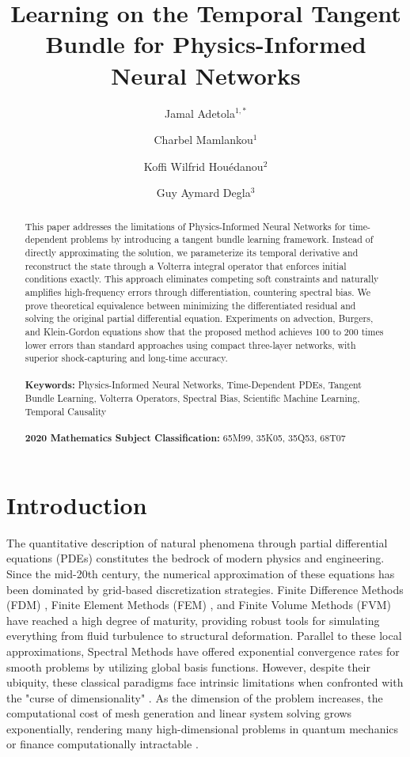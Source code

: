 \documentclass[11pt,reqno]{amsart}
\title[Learning on the Temporal Tangent Bundle]{Learning on the Temporal Tangent Bundle for Physics-Informed Neural Networks}
\author[J.A.]{Jamal Adetola$^{1,*}$}
\author[C.M.]{Charbel Mamlankou$^{1}$}
\author[K.W.H.]{Koffi Wilfrid Hou\'edanou$^2$}
\author[S.A.A.]{Guy Aymard Degla$^3$}
\theoremstyle{plain}
\theoremstyle{definition}
\theoremstyle{remark}
\begin{document}
\begin{abstract}
This paper addresses the limitations of Physics-Informed Neural Networks for time-dependent problems by introducing a tangent bundle learning framework. Instead of directly approximating the solution, we parameterize its temporal derivative and reconstruct the state through a Volterra integral operator that enforces initial conditions exactly. This approach eliminates competing soft constraints and naturally amplifies high-frequency errors through differentiation, countering spectral bias. We prove theoretical equivalence between minimizing the differentiated residual and solving the original partial differential equation. Experiments on advection, Burgers, and Klein-Gordon equations show that the proposed method achieves 100 to 200 times lower errors than standard approaches using compact three-layer networks, with superior shock-capturing and long-time accuracy.\\ \\
\textbf{Keywords:} Physics-Informed Neural Networks, Time-Dependent PDEs, Tangent Bundle Learning, Volterra Operators, Spectral Bias, Scientific Machine Learning, Temporal Causality\\ \\ 
\textbf{2020 Mathematics Subject Classification:} 65M99, 35K05, 35Q53, 68T07
\end{abstract}

\maketitle

\section{Introduction}

The quantitative description of natural phenomena through partial differential equations (PDEs) constitutes the bedrock of modern physics and engineering. Since the mid-20th century, the numerical approximation of these equations has been dominated by grid-based discretization strategies. Finite Difference Methods (FDM) \cite{strikwerda2004}, Finite Element Methods (FEM) \cite{brenner2008, ciarlet2002}, and Finite Volume Methods (FVM) \cite{leveque2002} have reached a high degree of maturity, providing robust tools for simulating everything from fluid turbulence to structural deformation. Parallel to these local approximations, Spectral Methods \cite{boyd2001, canuto2006, gottlieb1977} have offered exponential convergence rates for smooth problems by utilizing global basis functions. However, despite their ubiquity, these classical paradigms face intrinsic limitations when confronted with the "curse of dimensionality" \cite{bellman1961}. As the dimension of the problem increases, the computational cost of mesh generation and linear system solving grows exponentially, rendering many high-dimensional problems in quantum mechanics or finance computationally intractable \cite{han2018, weinan2017}.
\end{document}
